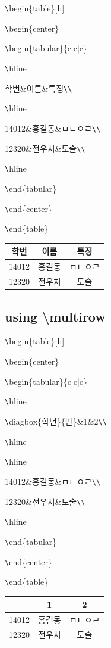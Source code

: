 \documentclass[11pt]{article}
\begin{document}
\longline

\verb+\+begin\{table\}[h]

\verb+\+begin\{center\}

\verb+\+begin\{tabular\}\{c|c|c\}

\verb+\+hline

학번\&이름\&특징\verb+\+\verb+\+

\verb+\+hline

14012\&홍길동\&ㅁㄴㅇㄹ\verb+\+\verb+\+

12320\&전우치\&도술\verb+\+\verb+\+

\verb+\+hline

\verb+\+end\{tabular\}

\verb+\+end\{center\}

\verb+\+end\{table\}

\begin{table}[h]
	\begin{center}
		\begin{tabular}{c|c|c}
			\hline
			학번&이름&특징\\
			\hline
			14012&홍길동&ㅁㄴㅇㄹ\\
			12320&전우치&도술\\
			\hline
		\end{tabular}
	\end{center}
\end{table}

\subsection{using \textbackslash multirow}

\verb+\+begin\{table\}[h]

\verb+\+begin\{center\}

\verb+\+begin\{tabular\}\{c|c|c\}

\verb+\+hline

\verb+\+diagbox\{학년\}\{반\}\&1\&2\verb+\+\verb+\+

\verb+\+hline

\verb+\+hline

14012\&홍길동\&ㅁㄴㅇㄹ\verb+\+\verb+\+

12320\&전우치\&도술\verb+\+\verb+\+

\verb+\+hline

\verb+\+end\{tabular\}

\verb+\+end\{center\}

\verb+\+end\{table\}

\begin{table}[h]
	\begin{center}
		\begin{tabular}{c|c|c}
			\hline
			\diagbox{학년}{반}&1&2\\
			\hline
			\hline
			14012&홍길동&ㅁㄴㅇㄹ\\
			12320&전우치&도술\\
			\hline
		\end{tabular}
	\end{center}
\end{table}
\end{document}

